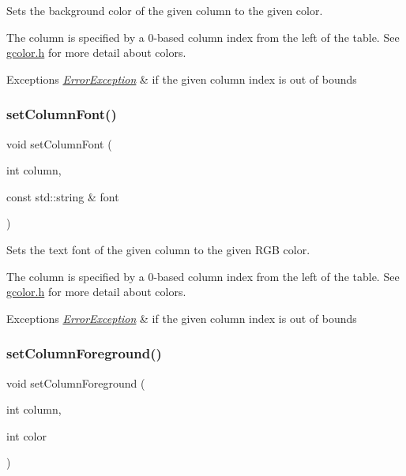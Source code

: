 Sets the background color of the given column to the given color. 

The column is specified by a 0-\/based column index from the left of the table. See \mbox{\hyperlink{gcolor_8h_source}{gcolor.\+h}} for more detail about colors. 
\begin{DoxyExceptions}{Exceptions}
{\em \mbox{\hyperlink{classErrorException}{Error\+Exception}}} & if the given column index is out of bounds \\
\hline
\end{DoxyExceptions}
\mbox{\label{classGTable_a0294ee7cb1af024bc77371f27d877164}} 
\subsubsection{\texorpdfstring{set\+Column\+Font()}{setColumnFont()}}
{\footnotesize\ttfamily void set\+Column\+Font (\begin{DoxyParamCaption}\item[{int}]{column,  }\item[{const std\+::string \&}]{font }\end{DoxyParamCaption})\hspace{0.3cm}{\ttfamily [virtual]}}



Sets the text font of the given column to the given R\+GB color. 

The column is specified by a 0-\/based column index from the left of the table. See \mbox{\hyperlink{gcolor_8h_source}{gcolor.\+h}} for more detail about colors. 
\begin{DoxyExceptions}{Exceptions}
{\em \mbox{\hyperlink{classErrorException}{Error\+Exception}}} & if the given column index is out of bounds \\
\hline
\end{DoxyExceptions}
\mbox{\label{classGTable_aa616c02b04beb6ca757dec04f46814b0}} 
\subsubsection{\texorpdfstring{set\+Column\+Foreground()}{setColumnForeground()}\hspace{0.1cm}{\footnotesize\ttfamily [1/2]}}
{\footnotesize\ttfamily void set\+Column\+Foreground (\begin{DoxyParamCaption}\item[{int}]{column,  }\item[{int}]{color }\end{DoxyParamCaption})\hspace{0.3cm}{\ttfamily [virtual]}}



